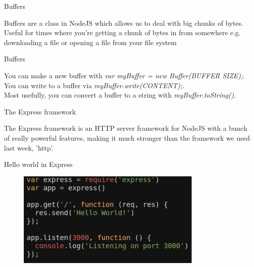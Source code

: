 \documentclass{beamer}
\begin{document}
\begin{frame}{Buffers}

Buffers are a class in NodeJS which allows us to deal with big chunks of bytes.\\
\pause
Useful for times where you're getting a chunk of bytes in from somewhere e.g. downloading a file or opening a file from your file system

\end{frame}

\begin{frame}{Buffers}

You can make a new buffer with \textit{var myBuffer = new Buffer(BUFFER SIZE);}.\\
\pause
You can write to a buffer via \textit{myBuffer.write(CONTENT);}.\\
\pause
Most usefully, you can convert a buffer to a string with \textit{myBuffer.toString()}.

\end{frame}

\begin{frame}{The Express framework}

The Express framework is an HTTP server framework for NodeJS with a bunch of really powerful features, making it much stronger than the framework we used last week, 'http'.


\end{frame}

\begin{frame}{Hello world in Express}

\begin{figure}[h]
\includegraphics[width=0.8\textwidth]{express}
\end{figure}


\end{frame}
\end{document}
